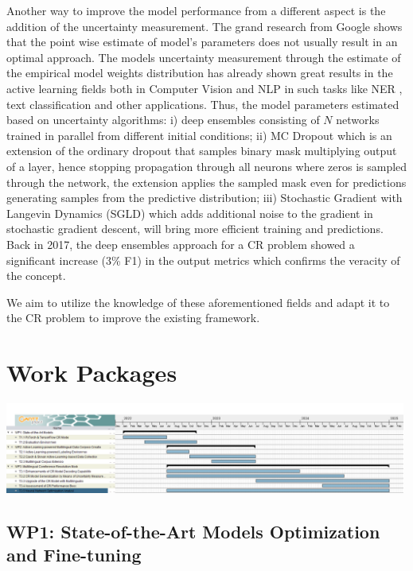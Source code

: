 Another way to improve the model performance from a different aspect is the addition of the uncertainty measurement. 
The grand research from Google \cite{ovadia2019can} shows that the point wise estimate of model’s parameters does not usually result in an optimal approach. The models uncertainty measurement through the estimate of the empirical model weights distribution has already shown great results in the active learning fields both in Computer Vision \cite{gal2017deep} and NLP in such tasks like NER \cite{shen2017deep, lowell2018practical}, text classification \cite{an2018deep} and other applications. 
Thus, the model parameters estimated based on uncertainty algorithms: i) deep ensembles \cite{lakshminarayanan2016simple} consisting of $N$ networks trained in parallel from different initial conditions; ii) MC Dropout \cite{gal2017deep} which is an extension of the ordinary dropout that samples binary mask multiplying output of a layer, hence stopping propagation through all neurons where zeros is sampled through the network, the extension applies the sampled mask even for predictions generating samples from the predictive distribution; iii) Stochastic Gradient with Langevin Dynamics (SGLD) \cite{welling2011bayesian} which adds additional noise to the gradient in stochastic gradient descent, will bring more efficient training and predictions. 
Back in 2017, the deep ensembles approach for a CR problem \cite{cr-Lee17} showed a significant increase (3\% F1) in the output metrics which confirms the veracity of the concept.

We aim to utilize the knowledge of these aforementioned fields and adapt it to the CR problem to improve the existing framework.

\section{Work Packages}\label{sec:wp}

\includegraphics[width=0.99\textwidth]{./figs/Timeschedule}

\subsection*{WP1: State-of-the-Art Models Optimization and Fine-tuning}

